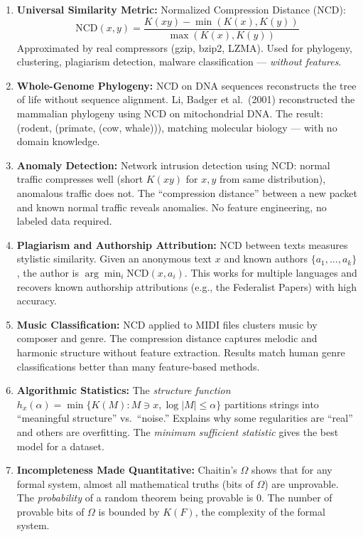 \begin{enumerate}
\item \textbf{Universal Similarity Metric:} Normalized Compression Distance (NCD):
\[
\text{NCD}(x,y) = \frac{K(xy) - \min(K(x), K(y))}{\max(K(x), K(y))}
\]
Approximated by real compressors (gzip, bzip2, LZMA). Used for phylogeny, clustering, plagiarism detection, malware classification --- \emph{without features}.

\item \textbf{Whole-Genome Phylogeny:} NCD on DNA sequences reconstructs the tree of life without sequence alignment. Li, Badger et al.\ (2001) reconstructed the mammalian phylogeny using NCD on mitochondrial DNA. The result: (rodent, (primate, (cow, whale))), matching molecular biology --- with no domain knowledge.

\item \textbf{Anomaly Detection:} Network intrusion detection using NCD: normal traffic compresses well (short $K(xy)$ for $x,y$ from same distribution), anomalous traffic does not. The ``compression distance'' between a new packet and known normal traffic reveals anomalies. No feature engineering, no labeled data required.

\item \textbf{Plagiarism and Authorship Attribution:} NCD between texts measures stylistic similarity. Given an anonymous text $x$ and known authors $\{a_1,\ldots,a_k\}$, the author is $\arg\min_i \text{NCD}(x,a_i)$. This works for multiple languages and recovers known authorship attributions (e.g., the Federalist Papers) with high accuracy.

\item \textbf{Music Classification:} NCD applied to MIDI files clusters music by composer and genre. The compression distance captures melodic and harmonic structure without feature extraction. Results match human genre classifications better than many feature-based methods.

\item \textbf{Algorithmic Statistics:} The \emph{structure function} $h_x(\alpha) = \min \{ K(M) : M \ni x, \log |M| \le \alpha \}$ partitions strings into ``meaningful structure'' vs.\ ``noise.'' Explains why some regularities are ``real'' and others are overfitting. The \emph{minimum sufficient statistic} gives the best model for a dataset.

\item \textbf{Incompleteness Made Quantitative:} Chaitin's $\Omega$ shows that for any formal system, almost all mathematical truths (bits of $\Omega$) are unprovable. The \emph{probability} of a random theorem being provable is 0. The number of provable bits of $\Omega$ is bounded by $K(F)$, the complexity of the formal system.


\end{enumerate}
